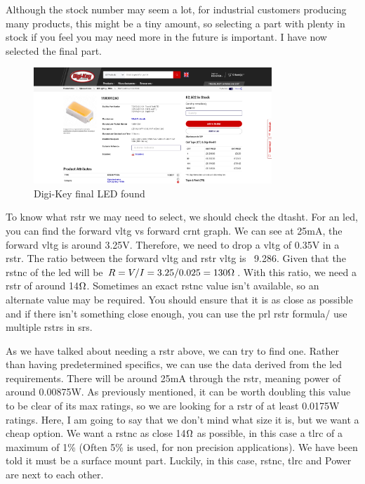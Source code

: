 \documentclass[a4paper,11pt]{report}
\begin{document}
Although the stock number may seem a lot, for industrial customers producing many products, this might be a tiny amount, so selecting a part with plenty in stock if you feel you may need more in the future is important. I have now selected the final part.


\begin{figure}[H]
\centering
\includegraphics[width=0.8\textwidth]{screenshots/DigiKeyWhiteLEDFinalPart}
\caption{Digi-Key final LED found}
\end{figure}

To know what \gls{rstr} we may need to select, we should check the \gls{dtasht}. For an \gls{led}, you can find the forward \gls{vltg} vs forward \gls{crnt} graph. We can see at 25mA, the forward \gls{vltg} is around 3.25V. Therefore, we need to drop a \gls{vltg} of 0.35V in a \gls{rstr}. The ratio between the forward \gls{vltg} and \gls{rstr} \gls{vltg} is ~9.286. Given that the \gls{rstnc} of the \gls{led} will be $R=V/I=3.25/0.025=130\ohm$. With this ratio, we need a \gls{rstr} of around 14$\ohm$. Sometimes an exact \gls{rstnc} value isn't available, so an alternate value may be required. You should ensure that it is as close as possible and if there isn't something close enough, you can use the \gls{prl} \gls{rstr} formula/ use multiple \gls{rstr}s in \gls{srs}.

As we have talked about needing a \gls{rstr} above, we can try to find one. Rather than having predetermined specifics, we can use the data derived from the \gls{led} requirements. There will be around 25mA through the \gls{rstr}, meaning power of around 0.00875W. As previously mentioned, it can be worth doubling this value to be clear of its max ratings, so we are looking for a \gls{rstr} of at least 0.0175W ratings. Here, I am going to say that we don't mind what size it is, but we want a cheap option. We want a \gls{rstnc} as close 14$\ohm$ as possible, in this case a \gls{tlrc} of a maximum of 1\% (Often 5\% is used, for non precision applications). We have been told it must be a surface mount part. Luckily, in this case, \gls{rstnc}, \gls{tlrc} and Power are next to each other.
\end{document}

